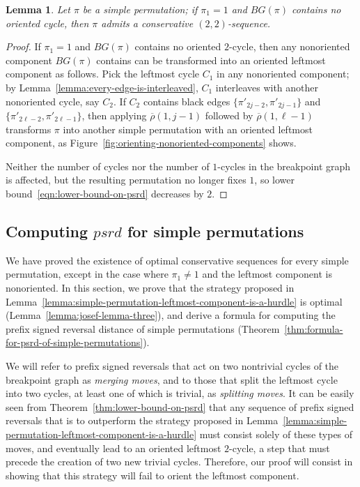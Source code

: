 \documentclass[review]{elsarticle}
\newtheorem{lemma}{Lemma}
\begin{document}
\begin{lemma}\label{lemma:simple-permutation-fixing-one}
Let $\pi$ be a simple permutation; if $\pi_1=1$ and $BG(\pi)$ contains no oriented cycle, then $\pi$ admits a conservative $(2,2)$-sequence.
\end{lemma}
\begin{proof}
If $\pi_1=1$ and $BG(\pi)$ contains no oriented $2$-cycle, then any nonoriented component $BG(\pi)$ contains can be transformed into an oriented leftmost component as follows. Pick the leftmost cycle $C_1$ in any nonoriented component; by Lemma~\ref{lemma:every-edge-is-interleaved}, $C_1$ interleaves with another nonoriented cycle, say $C_2$. If $C_2$ contains black edges $\{\pi'_{2j-2},\pi'_{2j-1}\}$ and $\{\pi'_{2\ell-2},\pi'_{2\ell-1}\}$, then applying $\overline{\rho}(1,j-1)$ followed by $\overline{\rho}(1,\ell-1)$ transforms $\pi$ into another simple permutation with an oriented leftmost component, as Figure~\ref{fig:orienting-nonoriented-components} shows.



Neither the number of cycles nor the number of $1$-cycles in the breakpoint graph is affected, but the resulting permutation no longer fixes $1$, so lower bound~\eqref{eqn:lower-bound-on-psrd} decreases by $2$.	
\end{proof}

\subsection{Computing $psrd$ for simple permutations}

We have proved the existence of optimal conservative sequences for every simple permutation, except in the case where $\pi_1\neq 1$ and the leftmost component is nonoriented. In this section, we prove that the strategy proposed in Lemma~\ref{lemma:simple-permutation-leftmost-component-is-a-hurdle} is optimal (Lemma~\ref{lemma:josef-lemma-three}), and derive a formula for computing the prefix signed reversal distance of simple permutations (Theorem~\ref{thm:formula-for-psrd-of-simple-permutations}).

We will refer to prefix signed reversals that act on two nontrivial cycles of the breakpoint graph as \emph{merging moves}, and to those that split the leftmost cycle into two cycles, at least one of which is trivial, as \emph{splitting moves}. It can be easily seen from Theorem~\ref{thm:lower-bound-on-psrd} that any sequence of prefix signed reversals that is to outperform the strategy proposed in Lemma~\ref{lemma:simple-permutation-leftmost-component-is-a-hurdle} must consist solely of these types of moves, and eventually lead to an oriented leftmost $2$-cycle, a step that must precede the creation of two new trivial cycles. Therefore, our proof will consist in showing that this strategy will fail to orient the leftmost component.
\end{document}
